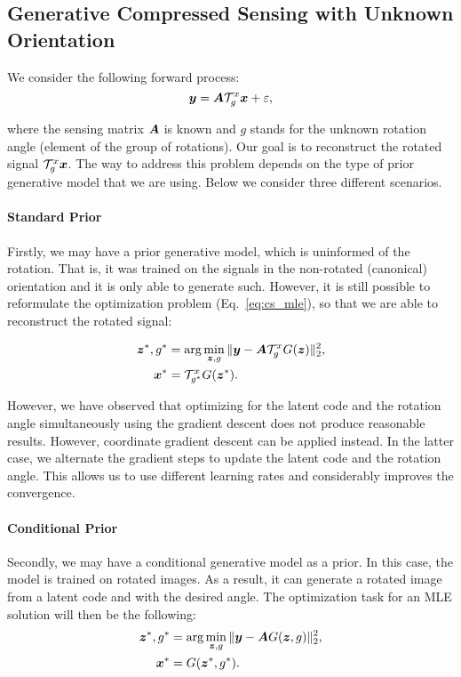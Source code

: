 \subsection{Generative Compressed Sensing with Unknown Orientation} \label{sec:gen_cs_rotation}

We consider the following forward process:
\begin{equation}
    {\bm{y}} = {\bm{A}} {\mathcal{T}}_g^x {\bm{x}} + \varepsilon,
\end{equation}

where the sensing matrix ${\bm{A}}$ is known and $g$ stands for the unknown rotation angle (element of the group of rotations). 
Our goal is to reconstruct the rotated signal ${\mathcal{T}}_g^x {\bm{x}}$. The way to address this problem depends on the type of prior generative model that we are using. Below we consider three different scenarios. 

\paragraph{Standard Prior}
Firstly, we may have a prior generative model, which is uninformed of the rotation. That is, it was trained on the signals in the non-rotated (canonical) orientation and it is only able to generate such. However, it is still possible to reformulate the optimization problem (Eq.~\ref{eq:cs_mle}), so that we are able to reconstruct the rotated signal:

\begin{align}
    {\bm{z}}^*, g^* &= \arg\min_{{\bm{z}}, g} \|{\bm{y}} - {\bm{A}} {\mathcal{T}}_{g}^x G({\bm{z}})\|_2^2, \\
    {\bm{x}}^* &= {\mathcal{T}}_{g^*}^x G({\bm{z}}^*).
\end{align}

However, we have observed that optimizing for the latent code and the rotation angle simultaneously using the gradient descent does not produce reasonable results. However, coordinate gradient descent can be applied instead. In the latter case, we alternate the gradient steps to update the latent code and the rotation angle. This allows us to use different learning rates and considerably improves the convergence. 

\paragraph{Conditional Prior}
Secondly, we may have a conditional generative model as a prior. In this case, the model is trained on rotated images. As a result, it can generate a rotated image from a latent code and with the desired angle. The optimization task for an MLE solution will then be the following:
\begin{align}
    {\bm{z}}^*, g^* &= \arg\min_{{\bm{z}}, g} \|{\bm{y}} - {\bm{A}} G({\bm{z}}, g)\|_2^2, \\
    {\bm{x}}^{*} &= G({\bm{z}}^*, g^*).
\end{align}


